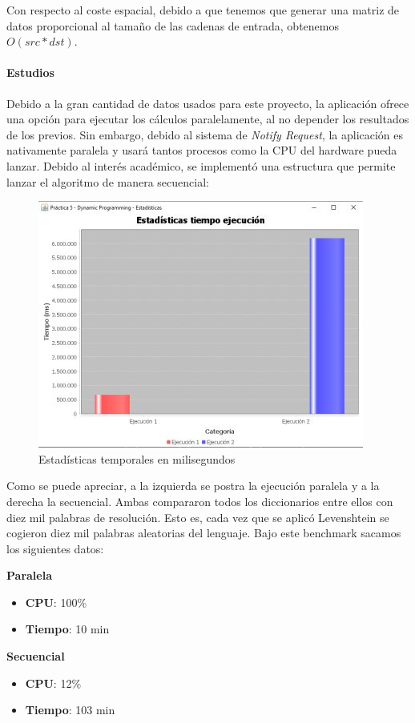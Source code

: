 Con respecto al coste espacial, debido a que tenemos que generar una matriz de datos proporcional al tamaño de las cadenas de entrada, obtenemos $O(src * dst)$.

\paragraph{Estudios}
Debido a la gran cantidad de datos usados para este proyecto, la aplicación ofrece una opción para ejecutar los cálculos paralelamente, al no depender los resultados de los previos. Sin embargo, debido al sistema de \textit{Notify Request}, la aplicación es nativamente paralela y usará tantos procesos como la CPU del hardware pueda lanzar. Debido al interés académico, se implementó una estructura que permite lanzar el algoritmo de manera secuencial:

\begin{figure}[!h]
    \centering
    \includegraphics[width=\linewidth]{MVC/Controller/img/stats.jpg}
    \caption{Estadísticas temporales en milisegundos}
    \label{fig:time_stats}
\end{figure}\bigskip

Como se puede apreciar, a la izquierda se postra la ejecución paralela y a la derecha la secuencial. Ambas compararon todos los diccionarios entre ellos con diez mil palabras de resolución. Esto es, cada vez que se aplicó Levenshtein se cogieron diez mil palabras aleatorias del lenguaje. Bajo este benchmark sacamos los siguientes datos:\\

\begin{multicols}{2}

\textbf{Paralela}
\begin{itemize}
    \item \textbf{CPU}: 100\% 
    \item \textbf{Tiempo}: 10 min
\end{itemize}
\vfill
\null
\columnbreak

\textbf{Secuencial}
\begin{itemize}
    \item \textbf{CPU}: 12\% 
    \item \textbf{Tiempo}: 103 min 
\end{itemize}
\vfill
\null
\end{multicols}

